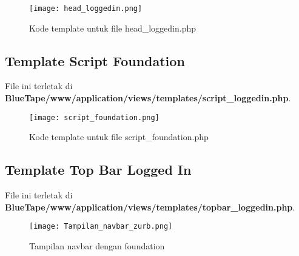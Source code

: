 \begin{figure} [H]
	\centering  
	\texttt{[image: head\_loggedin.png]}  
	\caption{Kode template untuk file head\_loggedin.php} 
\end{figure}

\subsection{Template Script Foundation}
File ini terletak di \textbf{BlueTape/www/application/views/templates/script\_loggedin.php}.
 
\begin{figure} [H]
	\centering  
	\texttt{[image: script\_foundation.png]}  
	\caption{Kode template untuk file script_foundation.php} 
\end{figure}
\subsection{Template Top Bar Logged In}
File ini terletak di \textbf{BlueTape/www/application/views/templates/topbar\_loggedin.php}.
\begin{figure} [H]
	\centering  
	\texttt{[image: Tampilan\_navbar\_zurb.png]}  
	\caption{Tampilan navbar dengan foundation} 
\end{figure}

